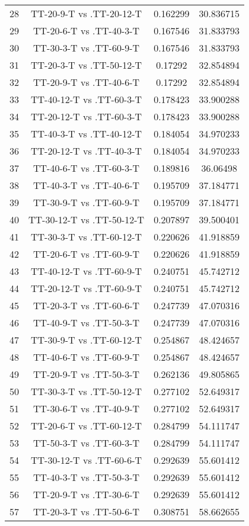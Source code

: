 \documentclass[a4paper,10pt]{article}
\begin{document}
\begin{landscape}
\begin{table}[!htp]
\begin{tabular}{cccc}
28&TT-20-9-T vs .TT-20-12-T&0.162299&30.836715\\
29&TT-20-6-T vs .TT-40-3-T&0.167546&31.833793\\
30&TT-30-3-T vs .TT-60-9-T&0.167546&31.833793\\
31&TT-20-3-T vs .TT-50-12-T&0.17292&32.854894\\
32&TT-20-9-T vs .TT-40-6-T&0.17292&32.854894\\
33&TT-40-12-T vs .TT-60-3-T&0.178423&33.900288\\
34&TT-20-12-T vs .TT-60-3-T&0.178423&33.900288\\
35&TT-40-3-T vs .TT-40-12-T&0.184054&34.970233\\
36&TT-20-12-T vs .TT-40-3-T&0.184054&34.970233\\
37&TT-40-6-T vs .TT-60-3-T&0.189816&36.06498\\
38&TT-40-3-T vs .TT-40-6-T&0.195709&37.184771\\
39&TT-30-9-T vs .TT-60-9-T&0.195709&37.184771\\
40&TT-30-12-T vs .TT-50-12-T&0.207897&39.500401\\
41&TT-30-3-T vs .TT-60-12-T&0.220626&41.918859\\
42&TT-20-6-T vs .TT-60-9-T&0.220626&41.918859\\
43&TT-40-12-T vs .TT-60-9-T&0.240751&45.742712\\
44&TT-20-12-T vs .TT-60-9-T&0.240751&45.742712\\
45&TT-20-3-T vs .TT-60-6-T&0.247739&47.070316\\
46&TT-40-9-T vs .TT-50-3-T&0.247739&47.070316\\
47&TT-30-9-T vs .TT-60-12-T&0.254867&48.424657\\
48&TT-40-6-T vs .TT-60-9-T&0.254867&48.424657\\
49&TT-20-9-T vs .TT-50-3-T&0.262136&49.805865\\
50&TT-30-3-T vs .TT-50-12-T&0.277102&52.649317\\
51&TT-30-6-T vs .TT-40-9-T&0.277102&52.649317\\
52&TT-20-6-T vs .TT-60-12-T&0.284799&54.111747\\
53&TT-50-3-T vs .TT-60-3-T&0.284799&54.111747\\
54&TT-30-12-T vs .TT-60-6-T&0.292639&55.601412\\
55&TT-40-3-T vs .TT-50-3-T&0.292639&55.601412\\
56&TT-20-9-T vs .TT-30-6-T&0.292639&55.601412\\
57&TT-20-3-T vs .TT-50-6-T&0.308751&58.662655\\

\end{tabular}
\end{table}
\end{landscape}
\end{document}
